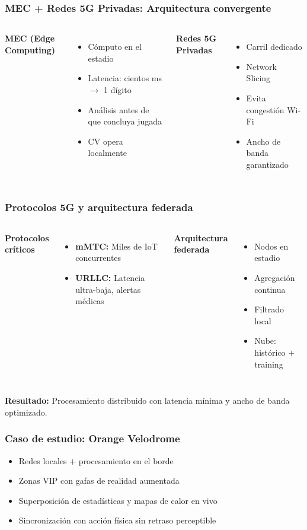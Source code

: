 \documentclass[aspectratio=169]{beamer}
\begin{document}
\begin{frame}\frametitle{MEC + Redes 5G Privadas: Arquitectura convergente}
\begin{columns}[T]
\textbf{MEC (Edge Computing)}
\begin{itemize}
    \item Cómputo en el estadio
    \item Latencia: cientos ms $\rightarrow$ 1 dígito
    \item Análisis antes de que concluya jugada
    \item CV opera localmente
\end{itemize}

\textbf{Redes 5G Privadas}
\begin{itemize}
    \item Carril dedicado
    \item Network Slicing
    \item Evita congestión Wi-Fi
    \item Ancho de banda garantizado
\end{itemize}
\end{columns}
\end{frame}

\begin{frame}\frametitle{Protocolos 5G y arquitectura federada}
\begin{columns}[T]
\textbf{Protocolos críticos}
\begin{itemize}
    \item \textbf{mMTC:} Miles de IoT concurrentes
    \item \textbf{URLLC:} Latencia ultra-baja, alertas médicas
\end{itemize}

\textbf{Arquitectura federada}
\begin{itemize}
    \item Nodos en estadio
    \item Agregación continua
    \item Filtrado local
    \item Nube: histórico $+$ training
\end{itemize}
\end{columns}
\textbf{Resultado:} Procesamiento distribuido con latencia mínima y ancho de banda optimizado.
\end{frame}

\begin{frame}\frametitle{Caso de estudio: Orange Velodrome}
\begin{itemize}
    \item Redes locales $+$ procesamiento en el borde
    \item Zonas VIP con gafas de realidad aumentada
    \item Superposición de estadísticas y mapas de calor en vivo
    \item Sincronización con acción física sin retraso perceptible
\end{itemize}
\end{frame}
\end{document}

